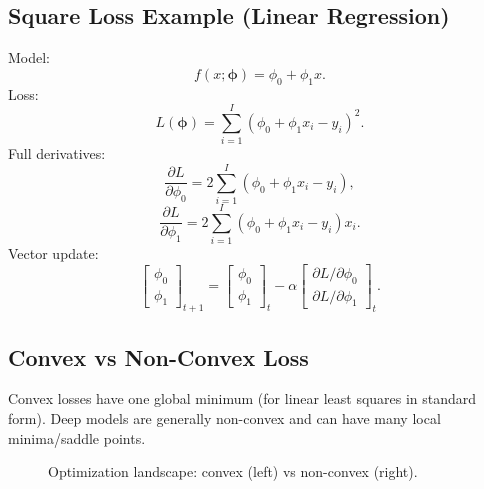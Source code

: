 \subsection{Square Loss Example (Linear Regression)}
Model:
\[
f(x;\boldsymbol{\phi})=\phi_0+\phi_1x.
\]
Loss:
\[
L(\boldsymbol{\phi})
=
\sum_{i=1}^{I}\left(\phi_0+\phi_1x_i-y_i\right)^2.
\]
Full derivatives:
\[
\frac{\partial L}{\partial \phi_0}
=
2\sum_{i=1}^{I}\left(\phi_0+\phi_1x_i-y_i\right),
\]
\[
\frac{\partial L}{\partial \phi_1}
=
2\sum_{i=1}^{I}\left(\phi_0+\phi_1x_i-y_i\right)x_i.
\]
Vector update:
\[
\begin{bmatrix}\phi_0\\\phi_1\end{bmatrix}_{t+1}
=
\begin{bmatrix}\phi_0\\\phi_1\end{bmatrix}_{t}
-\alpha
\begin{bmatrix}
\partial L/\partial \phi_0\\
\partial L/\partial \phi_1
\end{bmatrix}_{t}.
\]

\subsection{Convex vs Non-Convex Loss}
Convex losses have one global minimum (for linear least squares in standard form).
Deep models are generally non-convex and can have many local minima/saddle points.

\begin{figure}[h!]
\centering
{}
\caption{Optimization landscape: convex (left) vs non-convex (right).}
\end{figure}

